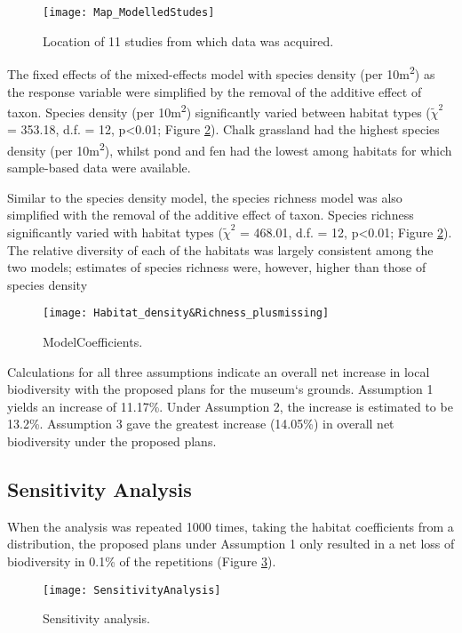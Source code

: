 \begin{figure}[t]
	\centering
	\texttt{[image: Map\_ModelledStudes]}
	\caption{Location of 11 studies from which data was acquired.}
   	 \label{fig:wlgmap}
\end{figure}

The fixed effects of the mixed-effects model with species density (per 10m\textsuperscript{2}) as the response variable were simplified by the removal of the additive effect of taxon. Species density (per 10m\textsuperscript{2}) significantly varied between habitat types ($\tilde{\chi}^2$ = 353.18, d.f. = 12, p<0.01; Figure \ref{fig:wlgmodel}). Chalk grassland had the highest species density (per 10m\textsuperscript{2}), whilst pond and fen had the lowest among habitats for which sample-based data were available. 

Similar to the species density model, the species richness model was also simplified with the removal of the additive effect of taxon.  Species richness significantly varied with habitat types ($\tilde{\chi}^2$ = 468.01, d.f. = 12, p<0.01; Figure \ref{fig:wlgmodel}).  The relative diversity of each of the habitats was largely consistent among the two models; estimates of species richness were, however, higher than those of species density
 	 
\begin{figure}[t]
	\centering
	\texttt{[image: Habitat\_density\&Richness\_plusmissing]}
	\caption{ModelCoefficients.}
   	 \label{fig:wlgmodel}
\end{figure}
	
Calculations for all three assumptions indicate an overall net increase in local biodiversity with the proposed plans for the museum`s grounds. Assumption 1 yields an increase of 11.17\%. Under Assumption 2, the increase is estimated to be 13.2\%. Assumption 3 gave the greatest increase (14.05\%) in overall net biodiversity under the proposed plans.

\subsection{Sensitivity Analysis}
When the analysis was repeated 1000 times, taking the habitat coefficients from a distribution, the proposed plans under Assumption 1 only resulted in a net loss of biodiversity in 0.1\% of the repetitions (Figure \ref{fig:wlgsensitivity}).

\begin{figure}[t]
	\centering
	\texttt{[image: SensitivityAnalysis]}
	\caption{Sensitivity analysis.}
   	 \label{fig:wlgsensitivity}
\end{figure}

